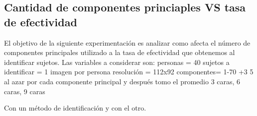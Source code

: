 \subsection{Cantidad de componentes princiaples VS tasa de efectividad}
El objetivo de la siguiente experimentación es analizar como afecta el n\'umero de componentes principales utilizado a la tasa de efectividad
que obtenemos al identificar sujetos. Las variables a considerar son: 
personas = 40
sujetos a identificar = 1 imagen por persona
resolución = 112x92
componentes= 1-70 +3
5 al azar por cada componente principal y después tomo el promedio
3 caras, 6 caras, 9 caras

Con un método de identificación y con el otro.